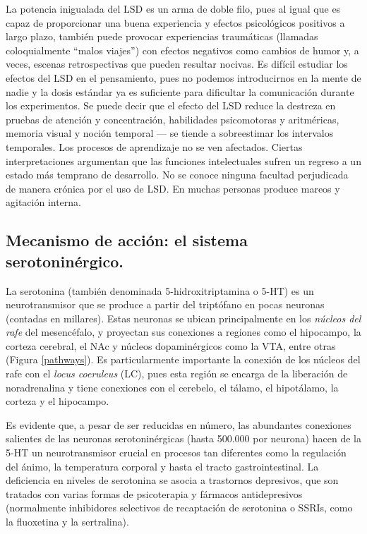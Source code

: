 La potencia inigualada del LSD es un arma de doble filo, pues al igual que es capaz de proporcionar una buena experiencia y efectos psicológicos positivos a largo plazo, también puede provocar experiencias traumáticas (llamadas coloquialmente \enquote{malos viajes}) con efectos negativos como cambios de humor y, a veces, escenas retrospectivas que pueden resultar nocivas. Es difícil estudiar los efectos del LSD en el pensamiento, pues no podemos introducirnos en la mente de nadie y la dosis estándar ya es suficiente para dificultar la comunicación durante los experimentos. Se puede decir que el efecto del LSD reduce la destreza en pruebas de atención y concentración, habilidades psicomotoras y aritméricas, memoria visual y noción temporal --- se tiende a sobreestimar los intervalos temporales. Los procesos de aprendizaje no se ven afectados. Ciertas interpretaciones argumentan que las funciones intelectuales sufren un regreso a un estado más temprano de desarrollo. No se conoce ninguna facultad perjudicada de manera crónica por el uso de LSD. En muchas personas produce mareos y agitación interna.

\subsection{Mecanismo de acción: el sistema serotoninérgico.}

La serotonina (también denominada 5-hidroxitriptamina o 5-HT) es un neurotransmisor que se produce a partir del triptófano en pocas neuronas (contadas en millares). Estas neuronas se ubican principalmente en los \textit{núcleos del rafe} del mesencéfalo, y proyectan sus conexiones a regiones como el hipocampo, la corteza cerebral, el NAc y núcleos dopaminérgicos como la VTA, entre otras (Figura \ref{pathways}). Es particularmente importante la conexión de los núcleos del rafe con el \textit{locus coeruleus} (LC), pues esta región se encarga de la liberación de noradrenalina y tiene conexiones con el cerebelo, el tálamo, el hipotálamo, la corteza y el hipocampo.

Es evidente que, a pesar de ser reducidas en número, las abundantes conexiones salientes de las neuronas serotoninérgicas (hasta 500.000 por neurona) hacen de la 5-HT un neurotransmisor crucial en procesos tan diferentes como la regulación del ánimo, la temperatura corporal y hasta el tracto gastrointestinal. La deficiencia en niveles de serotonina se asocia a trastornos depresivos, que son tratados con varias formas de psicoterapia y fármacos antidepresivos (normalmente inhibidores selectivos de recaptación de serotonina o SSRIs, como la fluoxetina y la sertralina).

